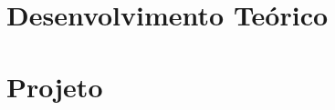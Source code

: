 








\frenchspacing 


\imprimircapa

\imprimirfolhaderosto*














\listoffigures*
\cleardoublepage

\listoftables*
\cleardoublepage





\tableofcontents*
\cleardoublepage

\textual
\part{Desenvolvimento Te\'orico}



\part{Projeto}




